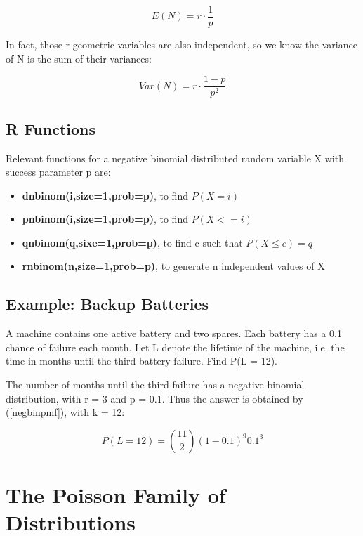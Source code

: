 \begin{equation}
E(N) = r \cdot \frac{1}{p}
\end{equation}

In fact, those r geometric variables are also independent, so we know
the variance of N is the sum of their variances:

\begin{equation}
Var(N) = r \cdot \frac{1-p}{p^2}
\end{equation} 

\subsection{R Functions}

Relevant functions for a negative binomial distributed random variable X
with success parameter p are:

\begin{itemize}

\item {\bf dnbinom(i,size=1,prob=p)}, to find $P(X = i)$

\item {\bf pnbinom(i,size=1,prob=p)}, to find $P(X <= i)$

\item {\bf qnbinom(q,sixe=1,prob=p)}, to find c such that $P(X \leq c) = q$

\item {\bf rnbinom(n,size=1,prob=p)}, to generate n independent values of X

\end{itemize}

\subsection{Example:  Backup Batteries}

A machine contains one active battery and two spares.  Each
battery has a 0.1 chance of failure each month.  Let L denote the
lifetime of the machine, i.e. the time in months until the third battery
failure.  Find P(L = 12).

The number of months until the third failure has a negative
binomial distribution, with r = 3 and p = 0.1.  Thus the answer is
obtained by (\ref{negbinpmf}), with k = 12:

\begin{equation}
P(L = 12) = \binom{11}{2} (1-0.1)^9 0.1^3
\end{equation}


\section{The Poisson Family of Distributions}
\label{poisfam}

